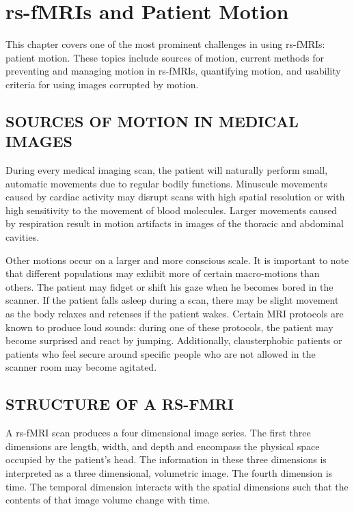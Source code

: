 \chapter{rs-fMRIs and Patient Motion}
\label{ch:mri}

This chapter covers one of the most prominent challenges in using rs-fMRIs: patient motion. These topics include sources of motion, current methods for preventing and managing motion in rs-fMRIs, quantifying motion, and usability criteria for using images corrupted by motion.

\section{SOURCES OF MOTION IN MEDICAL IMAGES}

During every medical imaging scan, the patient will naturally perform small, automatic movements due to regular bodily functions. Minuscule movements caused by cardiac activity may disrupt scans with high spatial resolution or with high sensitivity to the movement of blood molecules. Larger movements caused by respiration result in motion artifacts in images of the thoracic and abdominal cavities. 

Other motions occur on a larger and more conscious scale. It is important to note that different populations may exhibit more of certain macro-motions than others. The patient may fidget or shift his gaze when he becomes bored in the scanner. If the patient falls asleep during a scan, there may be slight movement as the body relaxes and retenses if the patient wakes. Certain MRI protocols are known to produce loud sounds: during one of these protocols, the patient may become surprised and react by jumping. Additionally, clausterphobic patients or patients who feel secure around specific people who are not allowed in the scanner room may become agitated. 

\section{STRUCTURE OF A RS-FMRI}

A rs-fMRI scan produces a four dimensional image series. The first three dimensions are length, width, and depth and encompass the physical space occupied by the patient's head. The information in these three dimensions is interpreted as a three dimensional, volumetric image. The fourth dimension is time. The temporal dimension interacts with the spatial dimensions such that the contents of that image volume change with time.

